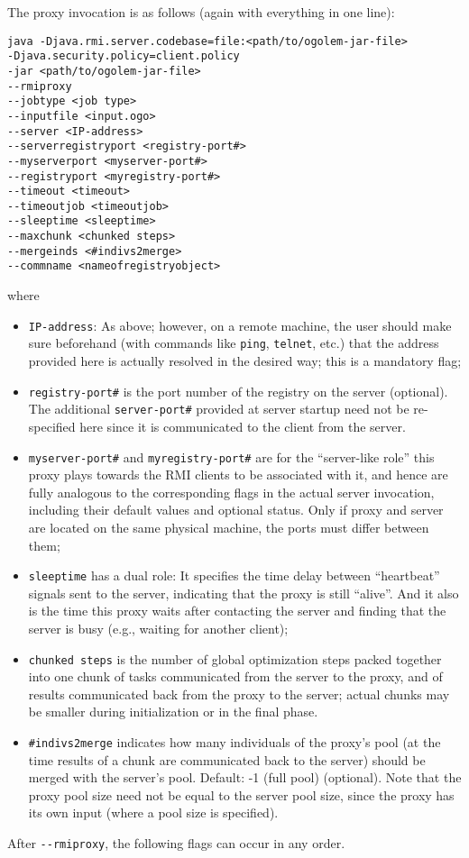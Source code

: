 \documentclass[a4paper,10pt]{scrbook}
\begin{document}
The proxy invocation is as follows (again with everything in one line):
\begin{verbatim}
java -Djava.rmi.server.codebase=file:<path/to/ogolem-jar-file> 
-Djava.security.policy=client.policy 
-jar <path/to/ogolem-jar-file> 
--rmiproxy
--jobtype <job type>
--inputfile <input.ogo>
--server <IP-address>
--serverregistryport <registry-port#>
--myserverport <myserver-port#>
--registryport <myregistry-port#>
--timeout <timeout> 
--timeoutjob <timeoutjob> 
--sleeptime <sleeptime>
--maxchunk <chunked steps>
--mergeinds <#indivs2merge>
--commname <nameofregistryobject>
\end{verbatim}
where
\begin{itemize}
\item \texttt{IP-address}: As above; however, on a remote machine, the user
  should make sure beforehand (with commands like \texttt{ping},
  \texttt{telnet}, etc.) that the address provided here is actually resolved
  in the desired way; this is a mandatory flag;
\item \texttt{registry-port\#} is the port number of the registry on the
  server (optional). The additional \texttt{server-port\#} provided at server
  startup need not be re-specified here since it is communicated to the client
  from the server.
\item \verb|myserver-port#| and \verb|myregistry-port#| are for the
  ``server-like role'' this proxy plays towards the RMI clients to be
  associated with it, and hence are fully analogous to the corresponding flags
  in the actual server invocation, including their default values and optional
  status. Only if proxy and server are located on the same physical machine,
  the ports must differ between them;
\item \texttt{sleeptime} has a dual role:
  It specifies the time delay between ``heartbeat'' signals sent to the
  server, indicating that the proxy is still ``alive''. And it also
  is the time this proxy waits after contacting the
  server and finding that the server is busy (e.g., waiting for another
  client);
\item \texttt{chunked steps} is the number of global optimization steps packed
  together into one chunk of tasks communicated from the server to the proxy,
  and of results communicated back from the proxy to the server; actual
  chunks may be smaller during initialization or in the final phase.
\item \verb|#indivs2merge| indicates how many individuals of the proxy's pool
  (at the time results of a chunk are communicated back to the server) should
  be merged with the server's pool. Default: -1 (full pool) (optional).
  Note that the proxy pool size need not be equal to the server pool size,
  since the proxy has its own input (where a pool size is specified).
\end{itemize}
After \verb|--rmiproxy|, the following flags can occur in any order.
\end{document}
